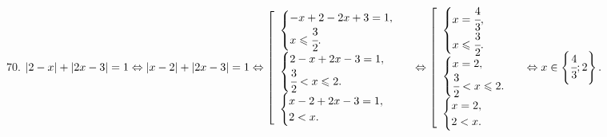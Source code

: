 70. $|2-x|+|2x-3|=1\Leftrightarrow |x-2|+|2x-3|=1\Leftrightarrow \left[\begin{array}{l}\begin{cases} -x+2-2x+3=1,\\ x\leqslant\cfrac{3}{2}.\end{cases}\\
\begin{cases} 2-x+2x-3=1,\\ \cfrac{3}{2}<x\leqslant2.\end{cases}\\ \begin{cases} x-2+2x-3=1,\\ 2<x.\end{cases}\end{array}\right.
\Leftrightarrow \left[\begin{array}{l}\begin{cases} x=\cfrac{4}{3},\\ x\leqslant\cfrac{3}{2}.\end{cases}\\
\begin{cases} x=2,\\ \cfrac{3}{2}<x\leqslant2.\end{cases}\\ \begin{cases} x=2,\\ 2<x.\end{cases}\end{array}\right.
\Leftrightarrow x\in\left\{\cfrac{4}{3};2\right\}.$\\

